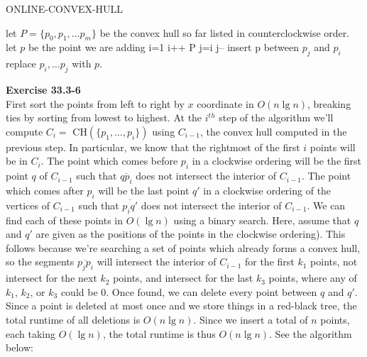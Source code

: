 \documentclass{article}
\begin{document}
\begin{algorithm}
\caption{ONLINE-CONVEX-HULL}
\begin{algorithmic}
\State let $P =\{p_0,p_1,\ldots p_m\}$ be the convex hull so far listed in counterclockwise order.
\State let $p$ be the point we are adding
\State i=1
\State i++
\EndWhile
{}
\State \Return P
\EndIf
\State j=i
\State j--
\EndWhile
{}
\State insert p between $p_j$ and $p_i$
\Else
\State replace $p_i, \ldots p_j$ with $p$.
\EndIf
\end{algorithmic}
\end{algorithm}

\noindent\textbf{Exercise 33.3-6}\\

First sort the points from left to right by $x$ coordinate in $O(n\lg n)$, breaking ties by sorting from lowest to highest.  At the $i^{th}$ step of the algorithm we'll compute $C_i =$ CH$(\{p_1, \ldots, p_{i}\})$ using $C_{i-1}$, the convex hull computed in the previous step. In particular, we know that the rightmost of the first $i$ points will be in $C_i$.  The point which comes before $p_i$ in a clockwise ordering will be the first point $q$ of $C_{i-1}$ such that $\overline{qp_i}$ does not intersect the interior of $C_{i-1}$.  The point which comes after $p_i$ will be the last point $q'$ in a clockwise ordering of the vertices of $C_{i-1}$ such that $\overline{p_i q'}$ does not intersect the interior of $C_{i-1}$.  We can find each of these points in $O(\lg n)$ using a binary search.  Here, assume that $q$ and $q'$ are given as the positions of the points in the clockwise ordering).  This follows because we're searching a set of points which already forms a convex hull, so the segments $\overline{p_j p_i}$ will intersect the interior of $C_{i-1}$ for the first $k_1$ points, not intersect for the next $k_2$ points, and intersect for the last $k_3$ points, where any of $k_1$, $k_2$, or $k_3$ could be 0. Once found, we can delete every point between $q$ and $q'$.  Since a point is deleted at most once and we store things in a red-black tree, the total runtime of all deletions is $O(n\lg n)$.  Since we insert a total of $n$ points, each taking $O(\lg n)$, the total runtime is thus $O(n\lg n)$.  See the algorithm below:
\end{document}
